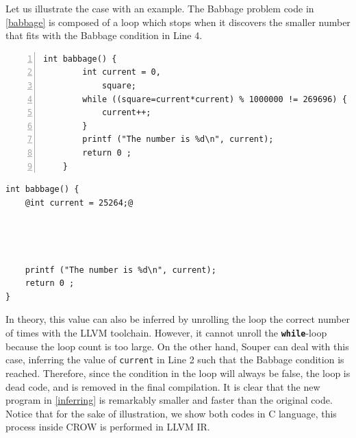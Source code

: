 Let us illustrate the case with an example.
The Babbage problem code in \autoref{babbage} is composed of a loop which stops when it discovers the smaller number that fits with the Babbage condition in Line 4.


{


\begin{minipage}[t]{0.5\linewidth}
    \begin{lstlisting}[numbers=left]
    int babbage() {
        int current = 0,
            square;
        while ((square=current*current) % 1000000 != 269696) {
            current++;
        }
        printf ("The number is %d\n", current);
        return 0 ;
    }
    \end{lstlisting}
\end{minipage}
\begin{minipage}[t]{0.5\linewidth}
    \begin{lstlisting}[]
int babbage() {
    @int current = 25264;@
    
    


    printf ("The number is %d\n", current);
    return 0 ;
}
    \end{lstlisting}
\end{minipage}
}
In theory, this value can also be inferred by unrolling the loop the correct number of times with the LLVM toolchain.
However, it cannot unroll the \texttt{\textbf{while}}-loop because the loop count is too large.
On the other hand, Souper can deal with this case, inferring the value of \texttt{current} in Line 2 such that the Babbage condition is reached. Therefore, since the condition in the loop will always be false, the loop is dead code, and is removed in the final compilation. It is clear that the new program in \autoref{inferring} is remarkably smaller and faster than the original code. Notice that for the sake of illustration, we show both codes in C language, this process inside CROW is performed in LLVM IR.


